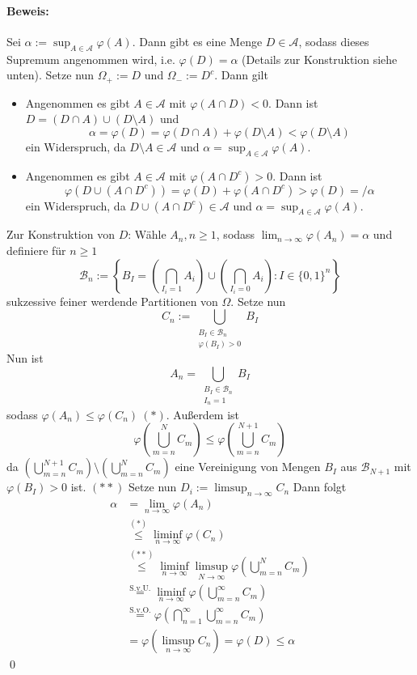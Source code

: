      \paragraph{Beweis:}Sei $\alpha:=\displaystyle\sup_{A\in\mathcal{A}}\varphi(A)$. Dann gibt es eine Menge $D\in\mathcal{A}$, sodass dieses Supremum angenommen wird, i.e. $\varphi(D)=\alpha$ (Details zur Konstruktion siehe unten).
     Setze nun $\Omega_+:=D$ und $\Omega_-:=D^c$. Dann gilt
     \begin{itemize}
         \item Angenommen es gibt $A\in\mathcal{A}$ mit $\varphi(A\cap D)<0$. Dann ist $D=(D\cap A)\cup(D\setminus A)$ und 
         $$\alpha=\varphi(D)=\varphi(D\cap A)+\varphi(D\setminus A)<\varphi(D\setminus A)$$
         ein Widerspruch, da $D\setminus A\in\mathcal{A}$ und $\alpha=\displaystyle\sup_{A\in\mathcal{A}}\varphi(A)$.
         \item Angenommen es gibt $A\in\mathcal{A}$ mit $\varphi(A\cap D^c)>0$. Dann ist 
         $$\varphi(D\cup(A\cap D^c))=\varphi(D)+\varphi(A\cap D^c)>\varphi(D)=/\alpha$$
         ein Widerspruch, da $D\cup(A\cap D^c)\in\mathcal{A}$ und $\alpha=\displaystyle\sup_{A\in\mathcal{A}}\varphi(A)$.
     \end{itemize}
     Zur Konstruktion von $D$:\newline
     W\"ahle $A_n,n\geq1$, sodass $\displaystyle\lim_{n\to\infty}\varphi(A_n)=\alpha$ und definiere f\"ur $n\geq1$
     $$\mathcal{B}_n:=\left\{B_I=\left(\bigcap_{I_i=1}A_i\right)\cup\left(\bigcap_{I_i=0}A_i\right):I\in\{0,1\}^n\right\}$$
     sukzessive feiner werdende Partitionen von $\Omega$. Setze nun 
     $$C_n:=\bigcup_{\substack{B_I\in\mathcal{B}_n\\ \varphi(B_I)>0}}B_I$$
     Nun ist 
     $$A_n=\bigcup_{\substack{B_I\in\mathcal{B}_n\\ I_n=1}}B_I$$
     sodass $\varphi(A_n)\leq\varphi(C_n)\ (*)$. Au\ss{}erdem ist 
     $$\varphi\left(\bigcup_{m=n}^NC_m\right)\leq\varphi\left(\bigcup_{m=n}^{N+1}C_m\right)$$
     da $\displaystyle\left(\bigcup_{m=n}^{N+1}C_m\right)\setminus \left(\bigcup_{m=n}^NC_m\right)$ eine Vereinigung von Mengen $B_I$ aus $\mathcal{B}_{N+1}$ mit $\varphi(B_I)>0$ ist. $(**)$\newline\newline 
     Setze nun $D_i:=\displaystyle\limsup_{n\to\infty}C_n$
     Dann folgt
     \begin{align*}
         \alpha&=\lim_{n\to\infty}\varphi(A_n) \\
         &\overset{(*)}{\leq}\liminf_{n\to\infty}\varphi(C_n)\\
         &\overset{(**)}{\leq}\liminf_{n\to\infty}\limsup_{N\to\infty}\varphi\left(\bigcup_{m=n}^NC_m\right)\\
         &\overset{\text{S.v.U.}}{=}\liminf_{n\to\infty}\varphi\left(\bigcup_{m=n}^\infty C_m\right)\\
         &\overset{\text{S.v.O.}}{=}\varphi\left(\bigcap_{n=1}^\infty \bigcup_{m=n}^\infty C_m\right)\\
         &=\varphi\left(\limsup_{n\to\infty}C_n\right)=\varphi(D)\leq\alpha
     \end{align*}
     \qed
     
